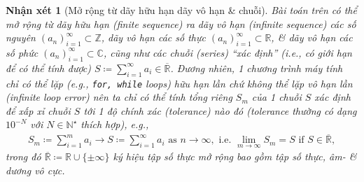 \documentclass{article}
\newtheorem{nhanxet}{Nhận xét}
\begin{document}
\begin{nhanxet}[Mở rộng từ dãy hữu hạn dãy vô hạn \& chuỗi]
	Bài toán trên có thể mở rộng từ dãy hữu hạn (finite sequence) ra dãy vô hạn (infinite sequence) các số nguyên $(a_n)_{i=1}^\infty\subset\mathbb{Z}$, dãy vô hạn các số thực $(a_n)_{i=1}^\infty\subset\mathbb{R}$, \& dãy vô hạn các số phức $(a_n)_{i=1}^\infty\subset\mathbb{C}$, cũng như các chuỗi (series) ``xác định'' (i.e., có giới hạn để có thể tính được) $S\coloneqq\sum_{i=1}^\infty a_i\in\overline{\mathbb{R}}$. Đương nhiên, 1 chương trình máy tính chỉ có thể lặp (e.g., {\tt for, while} loops) hữu hạn lần chứ không thể lặp vô hạn lần (infinite loop error) nên ta chỉ có thể tính tổng riêng $S_m$ của 1 chuỗi $S$ xác định để xấp xỉ chuỗi $S$ tới 1 độ chính xác (tolerance) nào đó (tolerance thường có dạng $10^{-N}$ với $N\in\mathbb{N}^\star$ thích hợp), e.g.,
	\begin{align*}
		S_m\coloneqq\sum_{i=1}^m a_i\to S\coloneqq\sum_{i=1}^\infty a_i\mbox{ as } n\to\infty,\mbox{ i.e. } \lim_{m\to\infty} S_m = S\mbox{ if } S\in\overline{\mathbb{R}},
	\end{align*}
	trong đó $\overline{\mathbb{R}}\coloneqq\mathbb{R}\cup\{\pm\infty\}$ ký hiệu tập số thực mở rộng bao gồm tập số thực, âm- \& dương vô cực.
\end{nhanxet}
\end{document}
